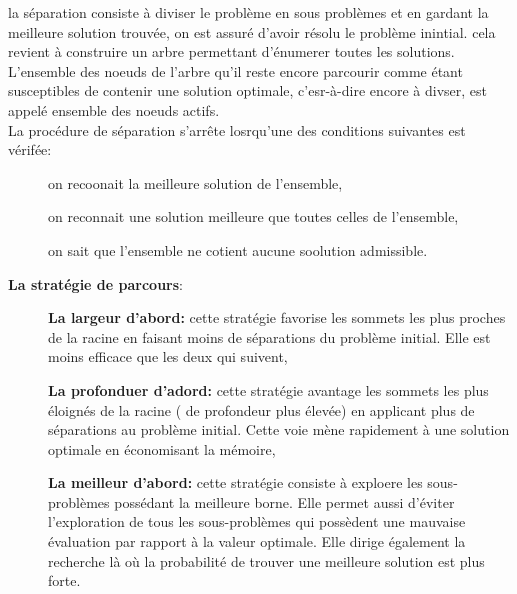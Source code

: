 \documentclass[a4paper,11pt,oneside]{report}
\theoremstyle{plain}
\newcommand{\0}{/ \! \! \! 0}
\theoremstyle{plain}
\begin{document}
 \begin{description}
 \item la s\'eparation consiste \`a diviser le probl\`eme en sous probl\`emes et en gardant la meilleure solution trouv\'ee, on est assur\'e d'avoir r\'esolu
  le probl\`eme inintial. cela revient \`a construire un arbre permettant d'\'enumerer toutes les solutions. L'ensemble des noeuds de l'arbre qu'il reste
  encore parcourir comme \'etant susceptibles de contenir une solution optimale, c'esr-\`a-dire encore \`a divser, est appel\'e ensemble des noeuds actifs.\\
  La proc\'edure de s\'eparation s'arr\^ete losrqu'une des conditions suivantes est v\'erif\'ee:
  \begin{description}
   \item[] on recoonait la meilleure solution de l'ensemble,
   \item[] on reconnait une solution meilleure que toutes celles de l'ensemble,
   \item[] on sait que l'ensemble ne cotient aucune soolution admissible.
  \end{description}
 \end{description}
  {\bf La strat\'egie de parcours}:
 \begin{description}
  \item[] {\bf La largeur d'abord:} cette strat\'egie favorise les sommets les plus proches de la racine en faisant moins de s\'eparations du probl\`eme 
  initial. Elle est moins efficace que les deux qui suivent, 
  \item[] {\bf La profonduer d'adord:} cette strat\'egie avantage les sommets les plus \'eloign\'es de la racine ( de profondeur plus \'elev\'ee) en applicant
   plus de s\'eparations au probl\`eme initial. Cette voie m\`ene rapidement \`a une solution optimale en \'economisant la m\'emoire,
  \item[] {\bf La meilleur d'abord:} cette strat\'egie consiste \`a exploere les sous-probl\`emes poss\'edant la meilleure borne. Elle permet aussi d'\'eviter l'exploration
   de tous les sous-probl\`emes qui poss\`edent une mauvaise \'evaluation par rapport \`a la valeur optimale. Elle dirige \'egalement la recherche l\`a o\`u
    la probabilit\'e de trouver une meilleure solution est plus forte.
 \end{description}
\end{document}
